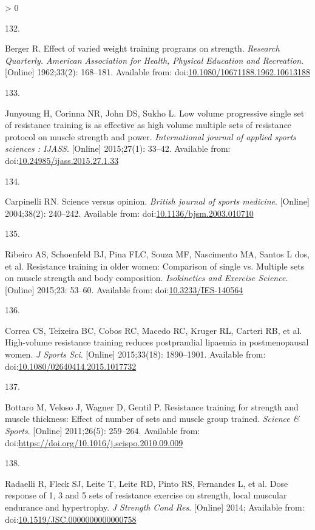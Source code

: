 \documentclass[twoside,10pt]{gihclass} %
\newlength{\cslhangindent}
\newlength{\csllabelwidth}
\newenvironment{CSLReferences}[3] %
 {%
  \setlength{\parindent}{0pt}
  \ifodd #1 \everypar{\setlength{\hangindent}{\cslhangindent}}\ignorespaces\fi
  \ifnum #2 > 0
  \setlength{\parskip}{#2\baselineskip}
  \fi
 }%
 {}
\newcommand{\CSLLeftMargin}[1]{\parbox[t]{\maxof{\widthof{#1}}{\csllabelwidth}}{#1}}
\newcommand{\CSLRightInline}[1]{\parbox[t]{\linewidth}{#1}}
\begin{document}
\begin{CSLReferences}{0}{0}
\leavevmode\hypertarget{ref-RN1476}{}%
\CSLLeftMargin{132. }
\CSLRightInline{Berger R. Effect of varied weight training programs on strength. \emph{Research Quarterly. American Association for Health, Physical Education and Recreation}. {[}Online{]} 1962;33(2): 168--181. Available from: doi:\href{https://doi.org/10.1080/10671188.1962.10613188}{10.1080/10671188.1962.10613188}}

\leavevmode\hypertarget{ref-RN2568}{}%
\CSLLeftMargin{133. }
\CSLRightInline{Junyoung H, Corinna NR, John DS, Sukho L. Low volume progressive single set of resistance training is as effective as high volume multiple sets of resistance protocol on muscle strength and power. \emph{International journal of applied sports sciences : IJASS}. {[}Online{]} 2015;27(1): 33--42. Available from: doi:\href{https://doi.org/10.24985/ijass.2015.27.1.33}{10.24985/ijass.2015.27.1.33}}

\leavevmode\hypertarget{ref-RN2201}{}%
\CSLLeftMargin{134. }
\CSLRightInline{Carpinelli RN. Science versus opinion. \emph{British journal of sports medicine}. {[}Online{]} 2004;38(2): 240--242. Available from: doi:\href{https://doi.org/10.1136/bjsm.2003.010710}{10.1136/bjsm.2003.010710}}

\leavevmode\hypertarget{ref-RN2465}{}%
\CSLLeftMargin{135. }
\CSLRightInline{Ribeiro AS, Schoenfeld BJ, Pina FLC, Souza MF, Nascimento MA, Santos L dos, et al. Resistance training in older women: Comparison of single vs. Multiple sets on muscle strength and body composition. \emph{Isokinetics and Exercise Science}. {[}Online{]} 2015;23: 53--60. Available from: doi:\href{https://doi.org/10.3233/IES-140564}{10.3233/IES-140564}}

\leavevmode\hypertarget{ref-RN2464}{}%
\CSLLeftMargin{136. }
\CSLRightInline{Correa CS, Teixeira BC, Cobos RC, Macedo RC, Kruger RL, Carteri RB, et al. High-volume resistance training reduces postprandial lipaemia in postmenopausal women. \emph{J Sports Sci}. {[}Online{]} 2015;33(18): 1890--1901. Available from: doi:\href{https://doi.org/10.1080/02640414.2015.1017732}{10.1080/02640414.2015.1017732}}

\leavevmode\hypertarget{ref-RN2463}{}%
\CSLLeftMargin{137. }
\CSLRightInline{Bottaro M, Veloso J, Wagner D, Gentil P. Resistance training for strength and muscle thickness: Effect of number of sets and muscle group trained. \emph{Science \& Sports}. {[}Online{]} 2011;26(5): 259--264. Available from: doi:\url{https://doi.org/10.1016/j.scispo.2010.09.009}}

\leavevmode\hypertarget{ref-RN1570}{}%
\CSLLeftMargin{138. }
\CSLRightInline{Radaelli R, Fleck SJ, Leite T, Leite RD, Pinto RS, Fernandes L, et al. Dose response of 1, 3 and 5 sets of resistance exercise on strength, local muscular endurance and hypertrophy. \emph{J Strength Cond Res}. {[}Online{]} 2014; Available from: doi:\href{https://doi.org/10.1519/JSC.0000000000000758}{10.1519/JSC.0000000000000758}}


\end{CSLReferences}
\end{document}
